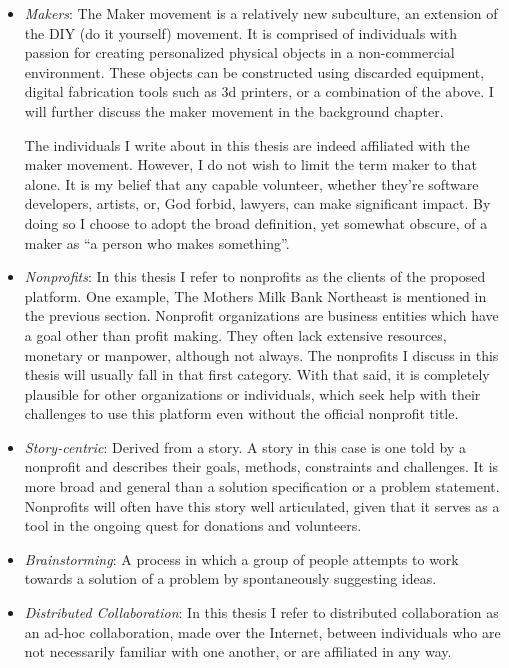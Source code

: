 \begin{itemize}
\item \textit{Makers}:
The Maker movement is a relatively new subculture, an extension of the DIY (do it yourself) movement. It is comprised of individuals with passion for creating personalized physical objects in a non-commercial environment. These objects can be constructed using discarded equipment, digital fabrication tools such as 3d printers, or a combination of the above. I will further discuss the maker movement in the background chapter.

The individuals I write about in this thesis are indeed affiliated with the maker movement. However, I do not wish to limit the term maker to that alone. It is my belief that any capable volunteer, whether they're software developers, artists, or, God forbid, lawyers, can make significant impact. By doing so I choose to adopt the broad definition, yet somewhat obscure, of a maker as ``a person who makes something''. 

\item \textit{Nonprofits}: 
In this thesis I refer to nonprofits as the clients of the proposed platform. One example, The Mothers Milk Bank Northeast is mentioned in the previous section. Nonprofit organizations are business entities which have a goal other than profit making. They often lack extensive resources, monetary or manpower, although not always. The nonprofits I discuss in this thesis will usually fall in that first category. With that said, it is completely plausible for other organizations or individuals, which seek help with their challenges to use this platform even without the official nonprofit title.

\item \textit{Story-centric}:
Derived from a story. A story in this case is one told by a nonprofit and describes their goals, methods, constraints and challenges. It is more broad and general than a solution specification or a problem statement. Nonprofits will often have this story well articulated, given that it serves as a tool in the ongoing quest for donations and volunteers. 

\item \textit{Brainstorming}:
A process in which a group of people attempts to work towards a solution of a problem by spontaneously suggesting ideas. 

\item \textit{Distributed Collaboration}:
In this thesis I refer to distributed collaboration as an ad-hoc collaboration, made over the Internet, between individuals who are not necessarily familiar with one another, or are affiliated in any way.  

\end{itemize}

